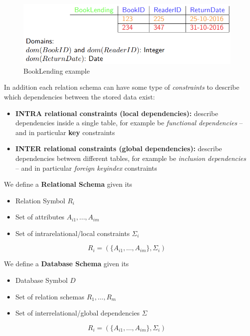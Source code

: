 \begin{figure}[!hbp]
    \centering
    \includegraphics[width=0.90\linewidth]{images/AdvancedDataManagment/rdbms/relational_database_2.png}
    \caption{BookLending example}
\end{figure}

In addition each relation schema can have some type of \textit{constraints} to describe which dependencies between the stored data exist:
\begin{itemize}
    \item \textbf{INTRA relational constraints (local dependencies):} describe dependencies inside a single table, for example be \textit{functional dependencies} – and in particular \textbf{key} constraints
    \item \textbf{INTER relational constraints (global dependencies):} describe dependencies between different tables, for example be \textit{inclusion dependencies} – and in particular \textit{foreign keyindex}
constraints
\end{itemize}

\begin{tcolorbox}
We define a \textbf{Relational Schema} given its
\begin{itemize}
    \item Relation Symbol \(R_i\)
    \item Set of attributes \(A_{i1},...,A_{im}\)
    \item Set of intrarelational/local constraints \(\Sigma_i\)
\end{itemize}
\[R_i = (\{A_{i1},...,A_{im}\}, \Sigma_i)\]
\end{tcolorbox}

\begin{tcolorbox}
We define a \textbf{Database Schema} given its
\begin{itemize}
    \item Database Symbol \(D\)
    \item Set of relation schemas  \(R_1,...,R_m\)
    \item Set of interrelational/global dependencies \(\Sigma\)
\end{itemize}
\[R_i = (\{A_{i1},...,A_{im}\}, \Sigma_i)\]
\end{tcolorbox}

